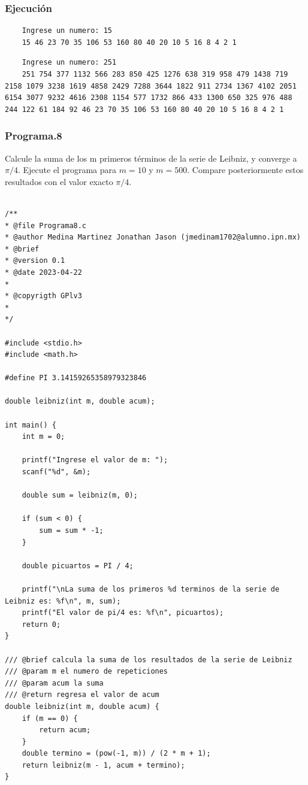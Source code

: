 \documentclass{article}
\begin{document}
	\subsubsection{Ejecución}
	
	\begin{lstlisting}
	Ingrese un numero: 15
	15 46 23 70 35 106 53 160 80 40 20 10 5 16 8 4 2 1 
	\end{lstlisting}
	
	\begin{lstlisting}
	Ingrese un numero: 251
	251 754 377 1132 566 283 850 425 1276 638 319 958 479 1438 719 2158 1079 3238 1619 4858 2429 7288 3644 1822 911 2734 1367 4102 2051 6154 3077 9232 4616 2308 1154 577 1732 866 433 1300 650 325 976 488 244 122 61 184 92 46 23 70 35 106 53 160 80 40 20 10 5 16 8 4 2 1 
	\end{lstlisting}
	
	\subsubsection{Programa.8}
	
	Calcule la suma de los m primeros términos de la serie de Leibniz, y converge a $\pi/4$. Ejecute el programa para $m = 10$ y $m = 500$. Compare posteriormente estos resultados con el valor exacto $\pi/4$.
	
	\begin{lstlisting}
		
/**
* @file Programa8.c
* @author Medina Martinez Jonathan Jason (jmedinam1702@alumno.ipn.mx)
* @brief 
* @version 0.1
* @date 2023-04-22
* 
* @copyrigth GPlv3
* 
*/

#include <stdio.h>
#include <math.h>

#define PI 3.14159265358979323846

double leibniz(int m, double acum);

int main() {
	int m = 0;
	
	printf("Ingrese el valor de m: ");
	scanf("%d", &m);
	
	double sum = leibniz(m, 0);
	
	if (sum < 0) {
		sum = sum * -1;
	}
	
	double picuartos = PI / 4;
	
	printf("\nLa suma de los primeros %d terminos de la serie de Leibniz es: %f\n", m, sum);
	printf("El valor de pi/4 es: %f\n", picuartos);
	return 0;
}

/// @brief calcula la suma de los resultados de la serie de Leibniz
/// @param m el numero de repeticiones
/// @param acum la suma
/// @return regresa el valor de acum
double leibniz(int m, double acum) {
	if (m == 0) {
		return acum;
	}
	double termino = (pow(-1, m)) / (2 * m + 1);
	return leibniz(m - 1, acum + termino);
}
	\end{lstlisting}
	
\end{document}
